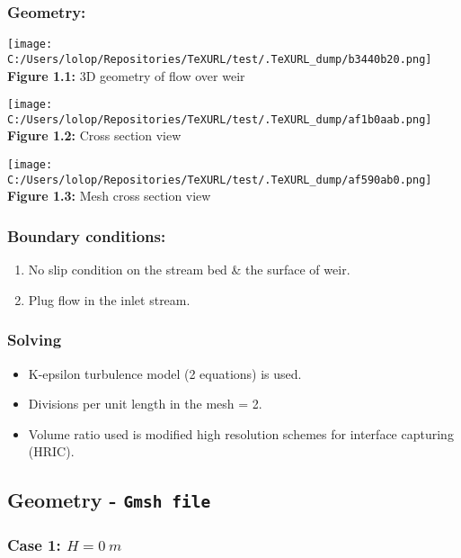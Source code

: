 \documentclass[11pt]{article}
\providecommand{\tightlist}{%
      \setlength{\itemsep}{0pt}\setlength{\parskip}{0pt}}
\begin{document}
\hypertarget{geometry}{%
\subsubsection{Geometry:}\label{geometry}}

\texttt{[image: C:/Users/lolop/Repositories/TeXURL/test/.TeXURL\_dump/b3440b20.png]} \textbf{Figure 1.1:}
3D geometry of flow over weir

\texttt{[image: C:/Users/lolop/Repositories/TeXURL/test/.TeXURL\_dump/af1b0aab.png]} \textbf{Figure 1.2:}
Cross section view

\texttt{[image: C:/Users/lolop/Repositories/TeXURL/test/.TeXURL\_dump/af590ab0.png]} \textbf{Figure 1.3:}
Mesh cross section view

\hypertarget{boundary-conditions}{%
\subsubsection{Boundary conditions:}\label{boundary-conditions}}

\begin{enumerate}
\def\labelenumi{\arabic{enumi}.}
\tightlist
\item
  No slip condition on the stream bed \& the surface of weir.
\item
  Plug flow in the inlet stream.
\end{enumerate}

\hypertarget{solving}{%
\subsubsection{Solving}\label{solving}}

\begin{itemize}
\tightlist
\item
  K-epsilon turbulence model (2 equations) is used.
\item
  Divisions per unit length in the mesh = 2.
\item
  Volume ratio used is modified high resolution schemes for interface
  capturing (HRIC).
\end{itemize}

\hypertarget{geometry---gmsh-file}{%
\subsection{\texorpdfstring{Geometry -
\texttt{Gmsh\ file}}{Geometry - Gmsh file}}\label{geometry---gmsh-file}}

\hypertarget{case-1-h-0-m}{%
\subsubsection{\texorpdfstring{Case 1:
\(H = 0\ m\)}{Case 1: H = 0\textbackslash{} m}}\label{case-1-h-0-m}}
\end{document}
